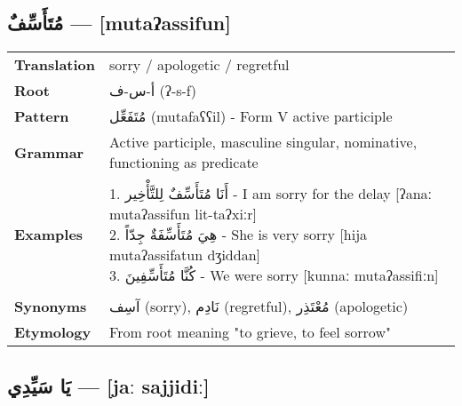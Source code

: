 \documentclass[letterpaper,12pt]{article}
\begin{document}
\subsection{\textarabic{مُتَأَسِّفٌ} — [mutaʔassifun]}

\begin{tabular}{p{3cm}p{10cm}}
\toprule
\textbf{Translation} & sorry / apologetic / regretful \\
\textbf{Root} & \textarabic{أ-س-ف} (ʔ-s-f) \\
\textbf{Pattern} & \textarabic{مُتَفَعِّل} (mutafaʕʕil) - Form V active participle \\
\textbf{Grammar} & Active participle, masculine singular, nominative, functioning as predicate \\
\midrule \\
\textbf{Examples} & \makecell[l]{\parbox{9.5cm}{
1. \textarabic{أَنَا مُتَأَسِّفٌ لِلتَّأْخِير} - I am sorry for the delay [ʔanaː mutaʔassifun lit-taʔxiːr]\\
2. \textarabic{هِيَ مُتَأَسِّفَةٌ جِدّاً} - She is very sorry [hija mutaʔassifatun dʒiddan]\\
3. \textarabic{كُنَّا مُتَأَسِّفِينَ} - We were sorry [kunnaː mutaʔassifiːn]
}} \\
\midrule \\
\textbf{Synonyms} & \textarabic{آسِف} (sorry), \textarabic{نَادِم} (regretful), \textarabic{مُعْتَذِر} (apologetic) \\
\textbf{Etymology} & From root meaning "to grieve, to feel sorrow" \\
\bottomrule
\end{tabular}

\subsection{\textarabic{يَا سَيِّدِي} — [jaː sajjidiː]}
\end{document}
